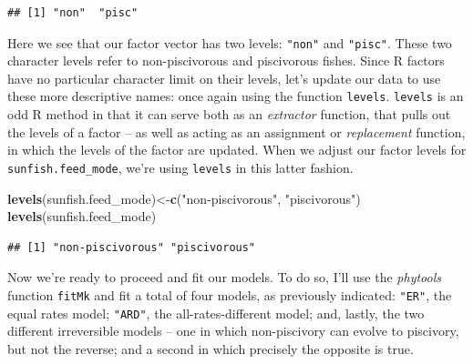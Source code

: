 \documentclass[fleqn,10pt,lineno]{wlpeerj} %
\newenvironment{Shaded}{\begin{snugshade}}{\end{snugshade}}
\newcommand{\FunctionTok}[1]{\textcolor[rgb]{0.13,0.29,0.53}{\textbf{#1}}}
\newcommand{\NormalTok}[1]{#1}
\newcommand{\OtherTok}[1]{\textcolor[rgb]{0.56,0.35,0.01}{#1}}
\newcommand{\SpecialCharTok}[1]{\textcolor[rgb]{0.81,0.36,0.00}{\textbf{#1}}}
\newcommand{\StringTok}[1]{\textcolor[rgb]{0.31,0.60,0.02}{#1}}
\begin{document}
\begin{Shaded}
\end{Shaded}

\begin{verbatim}
## [1] "non"  "pisc"
\end{verbatim}

Here we see that our factor vector has two levels: \texttt{"non"} and \texttt{"pisc"}. These two character levels refer to non-piscivorous and piscivorous fishes. Since R factors have no particular character limit on their levels, let's update our data to use these more descriptive names: once again using the function \texttt{levels}. \texttt{levels} is an odd R method in that it can serve both as an \emph{extractor} function, that pulls out the levels of a factor -- as well as acting as an assignment or \emph{replacement} function, in which the levels of the factor are updated. When we adjust our factor levels for \texttt{sunfish.feed\_mode}, we're using \texttt{levels} in this latter fashion.

\begin{Shaded}
\begin{Highlighting}[]
\FunctionTok{levels}\NormalTok{(sunfish.feed\_mode)}\OtherTok{\textless{}{-}}\FunctionTok{c}\NormalTok{(}\StringTok{"non{-}piscivorous"}\NormalTok{,}
  \StringTok{"piscivorous"}\NormalTok{)}
\FunctionTok{levels}\NormalTok{(sunfish.feed\_mode)}
\end{Highlighting}
\end{Shaded}

\begin{verbatim}
## [1] "non-piscivorous" "piscivorous"
\end{verbatim}

Now we're ready to proceed and fit our models. To do so, I'll use the \emph{phytools} function \texttt{fitMk} and fit a total of four models, as previously indicated: \texttt{"ER"}, the equal rates model; \texttt{"ARD"}, the all-rates-different model; and, lastly, the two different irreversible models -- one in which non-piscivory can evolve to piscivory, but not the reverse; and a second in which precisely the opposite is true.
\end{document}
